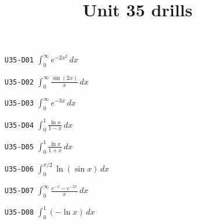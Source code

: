 \title{Unit 35 drills}\maketitle\begin{enumerate}
  \item[\texttt{U35-D01}] $\displaystyle \int_{0}^{\infty}e^{-2x^{2}}\,dx$
  \item[\texttt{U35-D02}] $\displaystyle \int_{0}^{\infty}\frac{\sin(2x)}{x}\,dx$
  \item[\texttt{U35-D03}] $\displaystyle \int_{0}^{\infty}e^{-3x}\,dx$
  \item[\texttt{U35-D04}] $\displaystyle \int_{0}^{1}\frac{\ln x}{1-x}\,dx$
  \item[\texttt{U35-D05}] $\displaystyle \int_{0}^{1}\frac{\ln x}{1+x}\,dx$
  \item[\texttt{U35-D06}] $\displaystyle \int_{0}^{\pi/2}\ln(\sin x)\,dx$
  \item[\texttt{U35-D07}] $\displaystyle \int_{0}^{\infty}\frac{e^{-x}-e^{-2x}}{x}\,dx$
  \item[\texttt{U35-D08}] $\displaystyle \int_{0}^{1}(-\ln x)\,dx$
\end{enumerate}

